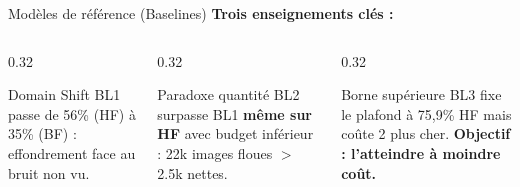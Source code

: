 \documentclass[aspectratio=169, 10pt]{beamer}
\begin{document}
\begin{frame}{Mod\`{e}les de r\'{e}f\'{e}rence (Baselines)}
  \medskip
  \textbf{\color{primary}Trois enseignements cl\'{e}s :}
  \begin{columns}[T]
    \begin{column}{0.32\textwidth}
      \begin{alertblock}{\footnotesize Domain Shift}
        \tiny BL1 passe de 56\% (HF) \`{a} 35\% (BF) : effondrement face au bruit non vu.
      \end{alertblock}
    \end{column}
    \begin{column}{0.32\textwidth}
      \begin{exampleblock}{\footnotesize Paradoxe quantit\'{e}}
        \tiny BL2 surpasse BL1 \textbf{m\^{e}me sur HF} avec budget inf\'{e}rieur : 22k images floues $>$ 2.5k nettes.
      \end{exampleblock}
    \end{column}
    \begin{column}{0.32\textwidth}
      \begin{block}{\footnotesize Borne sup\'{e}rieure}
        \tiny BL3 fixe le plafond \`{a} 75,9\% HF mais co\^{u}te 2\texttimes{} plus cher. \textbf{Objectif : l'atteindre \`{a} moindre co\^{u}t.}
      \end{block}
    \end{column}
  \end{columns}
\end{frame}
\end{document}
